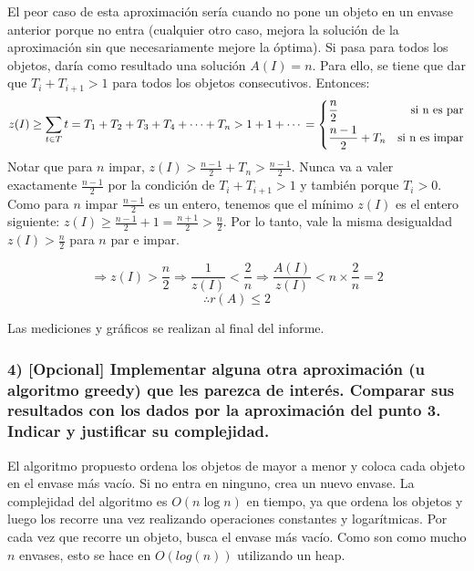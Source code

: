 \documentclass[11pt]{article}
\begin{document}
El peor caso de esta aproximación sería cuando no pone un objeto en un
envase anterior porque no entra (cualquier otro caso, mejora la solución
de la aproximación sin que necesariamente mejore la óptima). Si pasa
para todos los objetos, daría como resultado una solución \(A(I) = n\).
Para ello, se tiene que dar que \(T_i + T_{i+1} > 1\) para todos los
objetos consecutivos. Entonces: \[
z(I) \geq \sum\limits_{t \in T} t = T_1 + T_2 + T_3 + T_4 + \dotsb + T_n > 1 + 1 + \dotsb \\
= \left\{
    \begin{aligned}
        &\frac{n}{2} &\text{si n es par} \\
        &\frac{n-1}{2} + T_n &\text{si n es impar}
    \end{aligned}
\right.
\] Notar que para \(n\) impar,
\(z(I) > \frac{n-1}{2} + T_n > \frac{n-1}{2}\). Nunca va a valer
exactamente \(\frac{n-1}{2}\) por la condición de \(T_i + T_{i+1} > 1\)
y también porque \(T_i > 0\). Como para \(n\) impar \(\frac{n-1}{2}\) es
un entero, tenemos que el mínimo \(z(I)\) es el entero siguiente:
\(z(I) \geq \frac{n-1}{2} + 1 = \frac{n+1}{2} > \frac{n}{2}\). Por lo
tanto, vale la misma desigualdad \(z(I) > \frac{n}{2}\) para \(n\) par e
impar.

\[
\Rightarrow z(I) > \frac{n}{2} \Rightarrow \frac{1}{z(I)} < \frac{2}{n} \Rightarrow \frac{A(I)}{z(I)} < n \times \frac{2}{n} = 2
\] \[
\therefore r(A) \leq 2
\]

Las mediciones y gráficos se realizan al final del informe.

    \hypertarget{opcional-implementar-alguna-otra-aproximaciuxf3n-u-algoritmo-greedy-que-les-parezca-de-interuxe9s.-comparar-sus-resultados-con-los-dados-por-la-aproximaciuxf3n-del-punto-3.-indicar-y-justificar-su-complejidad.}{%
\subsubsection{4) {[}Opcional{]} Implementar alguna otra aproximación (u
algoritmo greedy) que les parezca de interés. Comparar sus resultados
con los dados por la aproximación del punto 3. Indicar y justificar su
complejidad.}\label{opcional-implementar-alguna-otra-aproximaciuxf3n-u-algoritmo-greedy-que-les-parezca-de-interuxe9s.-comparar-sus-resultados-con-los-dados-por-la-aproximaciuxf3n-del-punto-3.-indicar-y-justificar-su-complejidad.}}

    El algoritmo propuesto ordena los objetos de mayor a menor y coloca cada
objeto en el envase más vacío. Si no entra en ninguno, crea un nuevo
envase. La complejidad del algoritmo es \(O(n \log n)\) en tiempo, ya
que ordena los objetos y luego los recorre una vez realizando
operaciones constantes y logarítmicas. Por cada vez que recorre un
objeto, busca el envase más vacío. Como son como mucho \(n\) envases,
esto se hace en \(O(log(n))\) utilizando un heap.
\end{document}
